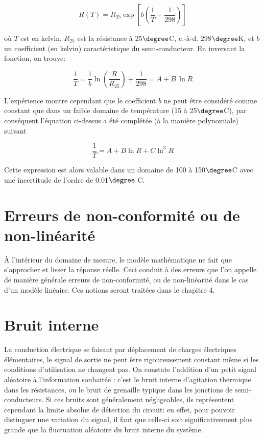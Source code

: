\begin{equation}
R(T) = R_{25}\exp{\left[b\left(\frac{1}{T}-\frac{1}{298}\right)\right]}
\end{equation}

où $T$ est en kelvin, $R_{25}$ est la résistance à 25$\degree$C, c.-à-d. 298$\degree$K, et $b$ un coefficient (en kelvin) caractéristique du semi-conducteur. En inversant la fonction, on trouve:

\begin{equation}
\frac{1}{T} = \frac{1}{b}\ln{\left(\frac{R}{R_{25}}\right)}+\frac{1}{298} = A + B\,\ln{R}
\end{equation}

L'expérience montre cependant que le coefficient $b$ ne peut être considéré comme constant que dans un faible domaine de température (15 à 25$\degree$C), par conséquent l'équation ci-dessus a été complétée (à la manière polynomiale) suivant

\begin{equation}
\frac{1}{T} = A + B \ln{R} + C \ln^3{R}
\end{equation}

Cette expression est alors valable dans un domaine de 100 à 150$\degree$C avec une incertitude de l'ordre de 0.01$\degree$ C.

\section{Erreurs de non-conformité ou de non-linéarité}

À l'intérieur du domaine de mesure, le modèle mathématique ne fait que s'approcher et lisser la réponse réelle. Ceci conduit à des erreurs que l'on appelle de manière générale erreurs de non-conformité, ou de non-linéarité dans le cas d'un modèle linéaire. Ces notions seront traitées dans le chapitre 4.

\section{Bruit interne}

La conduction électrique se faisant par déplacement de charges électriques élémentaires, le signal de sortie ne peut être rigoureusement constant même si les conditions d'utilisation ne changent pas. On constate l'addition d'un petit signal aléatoire à l'information souhaitée : c'est le bruit interne d'agitation thermique dans les résistances, ou le bruit de grenaille typique dans les jonctions de semi-conducteurs. Si ces bruits sont généralement négligeables, ils représentent cependant la limite absolue de détection du circuit: en effet, pour pouvoir distinguer une variation du signal, il faut que celle-ci soit significativement plus grande que la fluctuation aléatoire du bruit interne du système.

